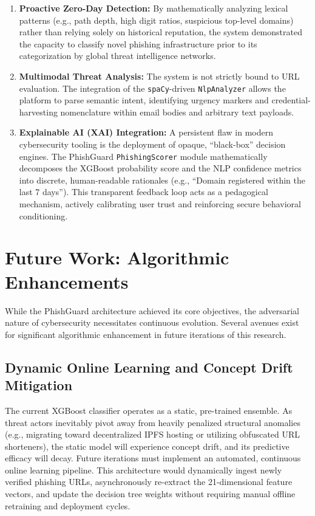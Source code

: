 \begin{enumerate}

\tightlist
\item
  \textbf{Proactive Zero-Day Detection:} By mathematically analyzing
  lexical patterns (e.g., path depth, high digit ratios, suspicious
  top-level domains) rather than relying solely on historical
  reputation, the system demonstrated the capacity to classify novel
  phishing infrastructure prior to its categorization by global threat
  intelligence networks.
\item
  \textbf{Multimodal Threat Analysis:} The system is not strictly bound
  to URL evaluation. The integration of the \texttt{spaCy}-driven
  \texttt{NlpAnalyzer} allows the platform to parse semantic intent,
  identifying urgency markers and credential-harvesting nomenclature
  within email bodies and arbitrary text payloads.
\item
  \textbf{Explainable AI (XAI) Integration:} A persistent flaw in modern
  cybersecurity tooling is the deployment of opaque, ``black-box''
  decision engines. The PhishGuard \texttt{PhishingScorer} module
  mathematically decomposes the XGBoost probability score and the NLP
  confidence metrics into discrete, human-readable rationales (e.g.,
  ``Domain registered within the last 7 days''). This transparent
  feedback loop acts as a pedagogical mechanism, actively calibrating
  user trust and reinforcing secure behavioral conditioning.
\end{enumerate}

\section{Future Work: Algorithmic
Enhancements}\label{future-work-algorithmic-enhancements}

While the PhishGuard architecture achieved its core objectives, the
adversarial nature of cybersecurity necessitates continuous evolution.
Several avenues exist for significant algorithmic enhancement in future
iterations of this research.

\subsection{Dynamic Online Learning and Concept Drift
Mitigation}\label{dynamic-online-learning-and-concept-drift-mitigation}

The current XGBoost classifier operates as a static, pre-trained
ensemble. As threat actors inevitably pivot away from heavily penalized
structural anomalies (e.g., migrating toward decentralized IPFS hosting
or utilizing obfuscated URL shorteners), the static model will
experience concept drift, and its predictive efficacy will decay. Future
iterations must implement an automated, continuous online learning
pipeline. This architecture would dynamically ingest newly verified
phishing URLs, asynchronously re-extract the 21-dimensional feature
vectors, and update the decision tree weights without requiring manual
offline retraining and deployment cycles.

